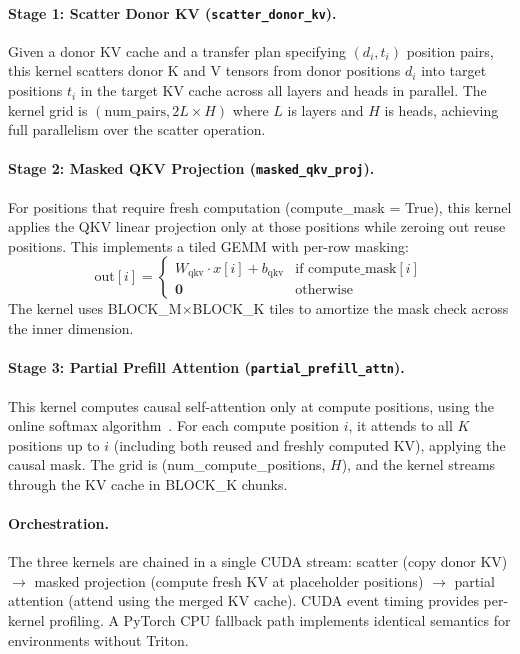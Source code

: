 \documentclass[11pt,twocolumn]{article}
\begin{document}
\paragraph{Stage 1: Scatter Donor KV (\texttt{scatter\_donor\_kv}).}
Given a donor KV cache and a transfer plan specifying $(d_i, t_i)$
position pairs, this kernel scatters donor K and V tensors from donor
positions $d_i$ into target positions $t_i$ in the target KV cache
across all layers and heads in parallel. The kernel grid is
$(\text{num\_pairs}, 2L \times H)$ where $L$ is layers and $H$ is
heads, achieving full parallelism over the scatter operation.

\paragraph{Stage 2: Masked QKV Projection
(\texttt{masked\_qkv\_proj}).}
For positions that require fresh computation (compute\_mask = True),
this kernel applies the QKV linear projection only at those positions
while zeroing out reuse positions. This implements a tiled GEMM with
per-row masking:
\begin{equation}
  \text{out}[i] = \begin{cases}
    W_\text{qkv} \cdot x[i] + b_\text{qkv} & \text{if compute\_mask}[i] \\
    \mathbf{0} & \text{otherwise}
  \end{cases}
\end{equation}
The kernel uses BLOCK\_M$\times$BLOCK\_K tiles to amortize the
mask check across the inner dimension.

\paragraph{Stage 3: Partial Prefill Attention
(\texttt{partial\_prefill\_attn}).}
This kernel computes causal self-attention only at compute positions,
using the online softmax algorithm~\cite{flashattention}. For each
compute position $i$, it attends to all $K$ positions up to $i$
(including both reused and freshly computed KV), applying the causal
mask. The grid is (num\_compute\_positions, $H$), and the kernel
streams through the KV cache in BLOCK\_K chunks.

\paragraph{Orchestration.} The three kernels are chained in a
single CUDA stream: scatter (copy donor KV) $\to$ masked projection
(compute fresh KV at placeholder positions) $\to$ partial attention
(attend using the merged KV cache). CUDA event timing provides
per-kernel profiling. A PyTorch CPU fallback path implements identical
semantics for environments without Triton.
\end{document}

